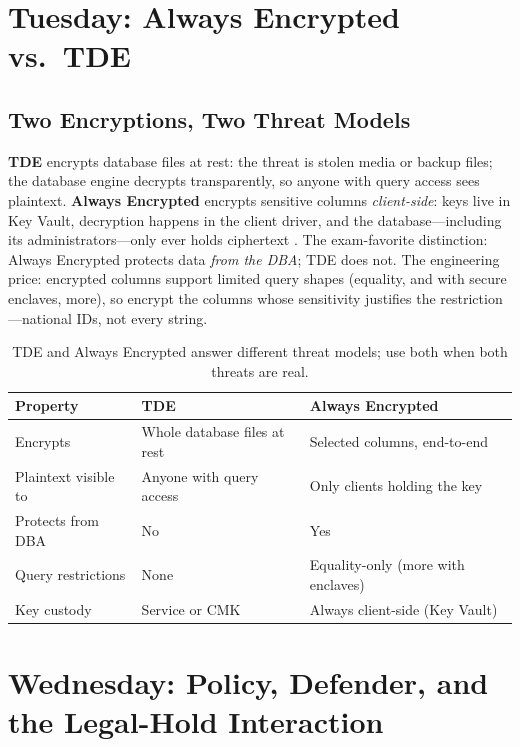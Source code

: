 \section{Tuesday: Always Encrypted vs.\ TDE}

\subsection{Two Encryptions, Two Threat Models}
\textbf{TDE} encrypts database files at rest: the threat is stolen media or backup files; the database engine decrypts transparently, so anyone with query access sees plaintext. \textbf{Always Encrypted} encrypts sensitive columns \emph{client-side}: keys live in Key Vault, decryption happens in the client driver, and the database---including its administrators---only ever holds ciphertext \cite{microsoft2025alwaysEncrypted}. The exam-favorite distinction: Always Encrypted protects data \emph{from the DBA}; TDE does not. The engineering price: encrypted columns support limited query shapes (equality, and with secure enclaves, more), so encrypt the columns whose sensitivity justifies the restriction---national IDs, not every string.

\begin{table}[H]
\centering
\small
\begin{tabular}{@{}p{3.4cm}p{4.6cm}p{5.0cm}@{}}
\toprule
\textbf{Property} & \textbf{TDE} & \textbf{Always Encrypted} \\
\midrule
Encrypts & Whole database files at rest & Selected columns, end-to-end \\
Plaintext visible to & Anyone with query access & Only clients holding the key \\
Protects from DBA & No & Yes \\
Query restrictions & None & Equality-only (more with enclaves) \\
Key custody & Service or CMK & Always client-side (Key Vault) \\
\bottomrule
\end{tabular}
\caption{TDE and Always Encrypted answer different threat models; use both when both threats are real.}
\label{tab:ch23-encryption}
\end{table}

\section{Wednesday: Policy, Defender, and the Legal-Hold Interaction}

